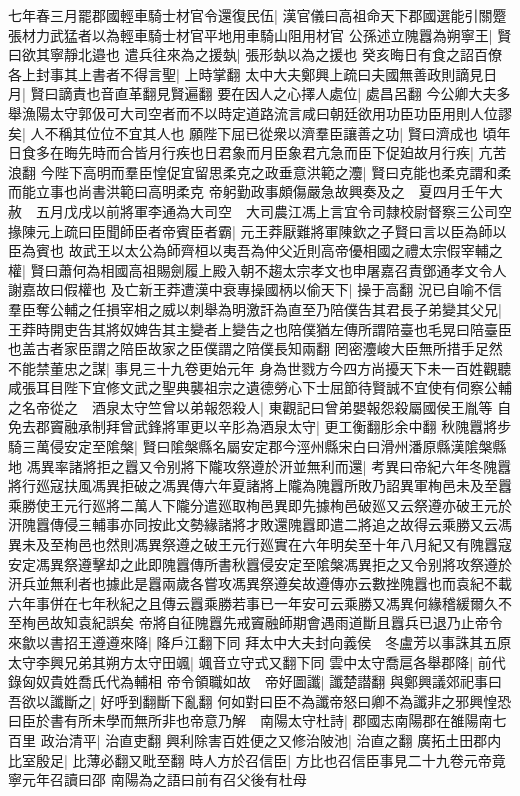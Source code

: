 七年春三月罷郡國輕車騎士材官令還復民伍|{
	漢官儀曰高祖命天下郡國選能引關蹷張材力武猛者以為輕車騎士材官平地用車騎山阻用材官}
公孫述立隗囂為朔寧王|{
	賢曰欲其寧靜北邉也}
遣兵往來為之援埶|{
	張形埶以為之援也}
癸亥晦日有食之詔百僚各上封事其上書者不得言聖|{
	上時掌翻}
太中大夫鄭興上疏曰夫國無善政則謫見日月|{
	賢曰謫責也音直革翻見賢遍翻}
要在因人之心擇人處位|{
	處昌呂翻}
今公卿大夫多舉漁陽太守郭伋可大司空者而不以時定道路流言咸曰朝廷欲用功臣功臣用則人位謬矣|{
	人不稱其位位不宜其人也}
願陛下屈已從衆以濟羣臣讓善之功|{
	賢曰濟成也}
頃年日食多在晦先時而合皆月行疾也日君象而月臣象君亢急而臣下促廹故月行疾|{
	亢苦浪翻}
今陛下高明而羣臣惶促宜留思柔克之政垂意洪範之灋|{
	賢曰克能也柔克謂和柔而能立事也尚書洪範曰高明柔克}
帝躬勤政事頗傷嚴急故興奏及之　夏四月壬午大赦　五月戊戌以前將軍李通為大司空　大司農江馮上言宜令司隸校尉督察三公司空掾陳元上疏曰臣聞師臣者帝賓臣者霸|{
	元王莽厭難將軍陳欽之子賢曰言以臣為師以臣為賓也}
故武王以太公為師齊桓以夷吾為仲父近則高帝優相國之禮太宗假宰輔之權|{
	賢曰蕭何為相國高祖賜劍履上殿入朝不趨太宗孝文也申屠嘉召責鄧通孝文令人謝嘉故曰假權也}
及亡新王莽遭漢中衰專操國柄以偷天下|{
	操于高翻}
況已自喻不信羣臣奪公輔之任損宰相之威以刺舉為明激訐為直至乃陪僕告其君長子弟變其父兄|{
	王莽時開吏告其將奴婢告其主變者上變告之也陪僕猶左傳所謂陪臺也毛晃曰陪臺臣也盖古者家臣謂之陪臣故家之臣僕謂之陪僕長知兩翻}
罔密灋峻大臣無所措手足然不能禁董忠之謀|{
	事見三十九卷更始元年}
身為世戮方今四方尚擾天下未一百姓觀聽咸張耳目陛下宜修文武之聖典襲祖宗之遺德勞心下士屈節待賢誠不宜使有伺察公輔之名帝從之　酒泉太守竺曾以弟報怨殺人|{
	東觀記曰曾弟嬰報怨殺屬國侯王胤等}
自免去郡竇融承制拜曾武鋒將軍更以辛肜為酒泉太守|{
	更工衡翻肜余中翻}
秋隗囂將步騎三萬侵安定至隂槃|{
	賢曰隂槃縣名屬安定郡今涇州縣宋白曰滑州潘原縣漢隂槃縣地}
馮異率諸將拒之囂又令别將下隴攻祭遵於汧並無利而還|{
	考異曰帝紀六年冬隗囂將行廵寇扶風馮異拒破之馮異傳六年夏諸將上隴為隗囂所敗乃詔異軍栒邑未及至囂乘勝使王元行廵將二萬人下隴分遣廵取栒邑異即先據栒邑破廵又云祭遵亦破王元於汧隗囂傳侵三輔事亦同按此文勢緣諸將才敗還隗囂即遣二將追之故得云乘勝又云馮異未及至栒邑也然則馮異祭遵之破王元行廵實在六年明矣至十年八月紀又有隗囂寇安定馮異祭遵擊却之此即隗囂傳所書秋囂侵安定至隂槃馮異拒之又令别將攻祭遵於汧兵並無利者也據此是囂兩歲各嘗攻馮異祭遵矣故遵傳亦云數挫隗囂也而袁紀不載六年事併在七年秋紀之且傳云囂乘勝若事已一年安可云乘勝又馮異何緣稽緩爾久不至栒邑故知袁紀誤矣}
帝將自征隗囂先戒竇融師期會遇雨道斷且囂兵已退乃止帝令來歙以書招王遵遵來降|{
	降戶江翻下同}
拜太中大夫封向義侯　冬盧芳以事誅其五原太守李興兄弟其朔方太守田颯|{
	颯音立守式又翻下同}
雲中太守喬扈各舉郡降|{
	前代錄匈奴貴姓喬氏代為輔相}
帝令領職如故　帝好圖讖|{
	讖楚譛翻}
與鄭興議郊祀事曰吾欲以讖斷之|{
	好呼到翻斷下亂翻}
何如對曰臣不為讖帝怒曰卿不為讖非之邪興惶恐曰臣於書有所未學而無所非也帝意乃解　南陽太守杜詩|{
	郡國志南陽郡在雒陽南七百里}
政治清平|{
	治直吏翻}
興利除害百姓便之又修治陂池|{
	治直之翻}
廣拓土田郡内比室殷足|{
	比薄必翻又毗至翻}
時人方於召信臣|{
	方比也召信臣事見二十九卷元帝竟寧元年召讀曰邵}
南陽為之語曰前有召父後有杜母

